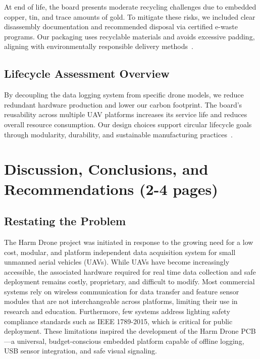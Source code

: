 \documentclass[12pt]{article}
\begin{document}
\par At end of life, the board presents moderate recycling challenges due to embedded copper, tin, and trace amounts of gold. To mitigate these risks, we included clear disassembly documentation and recommended disposal via certified e-waste programs. Our packaging uses recyclable materials and avoids excessive padding, aligning with environmentally responsible delivery methods~\cite{epa2023}.

\subsection{Lifecycle Assessment Overview}

\par By decoupling the data logging system from specific drone models, we reduce redundant hardware production and lower our carbon footprint. The board’s reusability across multiple UAV platforms increases its service life and reduces overall resource consumption. Our design choices support circular lifecycle goals through modularity, durability, and sustainable manufacturing practices~\cite{epa2023}.
\section{Discussion, Conclusions, and Recommendations (2-4 pages)}
\subsection{Restating the Problem}

\par The Harm Drone project was initiated in response to the growing need for a low cost, modular, and platform independent data acquisition system for small unmanned aerial vehicles (UAVs). While UAVs have become increasingly accessible, the associated hardware required for real time data collection and safe deployment remains costly, proprietary, and difficult to modify. Most commercial systems rely on wireless communication for data transfer and feature sensor modules that are not interchangeable across platforms, limiting their use in research and education. Furthermore, few systems address lighting safety compliance standards such as IEEE 1789-2015, which is critical for public deployment. These limitations inspired the development of the Harm Drone PCB—a universal, budget-conscious embedded platform capable of offline logging, USB sensor integration, and safe visual signaling.
\end{document}
